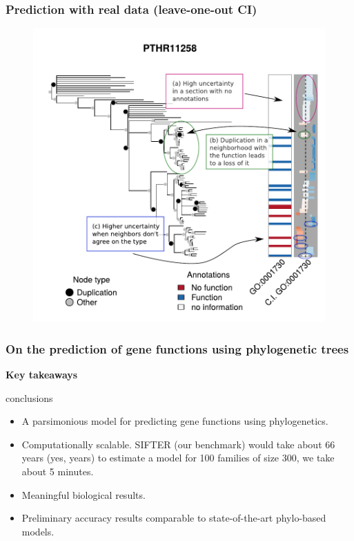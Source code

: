 \documentclass[aspectratio=169, 9pt]{beamer}\usepackage[]{graphicx}\usepackage[]{color}
\begin{document}
\begin{frame}
\frametitle{Prediction with real data (leave-one-out CI)}

\begin{figure}
\centering
\includegraphics[width=.5\linewidth, trim = 0 .5cm 0 .5cm, clip]{example-trees-good1-loo-annotated}
\end{figure}

\end{frame}
\begin{frame}[c]
\frametitle{On the prediction of gene functions using phylogenetic trees}

{\bf \large Key takeaways}
\begin{beamercolorbox}[dp=1ex]{conclusions}
\begin{itemize}
\item A parsimonious model for predicting gene functions using phylogenetics.
\item Computationally scalable. SIFTER (our benchmark)
would take about 66 years (yes, years) to estimate a model for 100 families
of size 300, we take about 5 minutes.
\item Meaningful biological results.
\item Preliminary accuracy results comparable to state-of-the-art phylo-based models.
\end{itemize}
\end{beamercolorbox}\pause


\end{frame}
\end{document}
